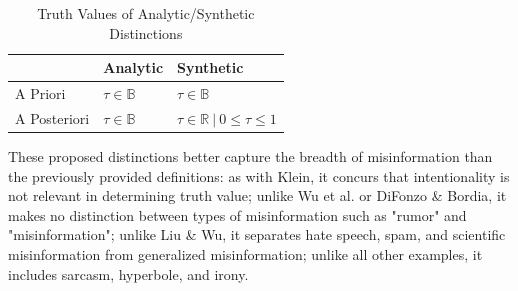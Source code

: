 \documentclass[preprint,review,12pt]{elsarticle}
\begin{document}
\begin{table}[h!]
\centering
\begin{tabular}{ |p{3cm}|p{5cm}|p{5cm}|}
 \hline
  & Analytic & Synthetic\\
 \hline
 A Priori & $\tau \in \mathbb{B}$ & $\tau \in \mathbb{B}$\\
 \hline
 A Posteriori &  $\tau \in \mathbb{B}$  & $\tau \in \mathbb{R} \ | \ 0 \leq \tau \leq 1$ \\
 \hline
\end{tabular}
\caption{Truth Values of Analytic/Synthetic Distinctions}
\label{tab:truthvalues}
\end{table}

These proposed distinctions better capture the breadth of misinformation than the previously provided definitions: as with Klein, it concurs that intentionality is not relevant in determining truth value; unlike Wu et al. or DiFonzo \& Bordia, it makes no distinction between types of misinformation such as "rumor" and "misinformation"; unlike Liu \& Wu, it separates hate speech, spam, and scientific misinformation from generalized misinformation; unlike all other examples, it includes sarcasm, hyperbole, and irony. 

 






\end{document}
